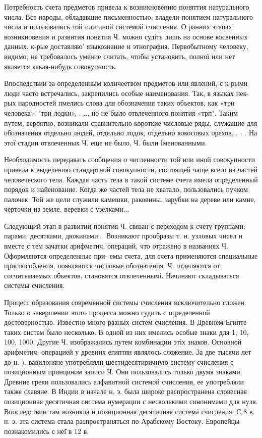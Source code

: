 \documentclass[10pt]{article}
\begin{document}
Потребность счета предметов привела к возникновению поняттия натурального числа. Все народы, обладавшие письменностью, владели понятием натурального числа и пользовались той или иной системой счисления. О ранних этапах возникновения и развития понятия Ч. можно судіть лишь на основе косвенных данных, к-рые доставляю' языкознание и этнография. Первобытному человеку, видимо, не требовалось умение считать, чтобы установить, полної или нет является какая-нибудь совокупность.



Впоследствии за определенным количеетвом предметов или явлений, с к-рыми люди часто встречались, закрепились особые наименования. Так, в языках нек-рых народностей пмелись слова для обозначения таких объектов, как «три человека», "три лодки», . .., но не было отвлеченного понятия «трп". Таким путем, вероятно, возникали сравнительно короткие числовые ряды, служащие для обозначения отдельно людей, отдельно лодок, отдельно кокосовых орехов, . . . На этої стадии отвлеченных Ч. еще не было, Ч. были Іменованными.



Необходимость передавать сообщения о численности той или иной совокупности привела к выделению стандартной совокупности, состоящей чаще всего из частей человеческого тела. Каждая часть тела в такой системе счета имела определенный порядок и найенование. Когда же частей тела не хватало, пользовались пучком палочек. Той же цели служили камешки, раковины, зарубки на дереве или камне, черточки на земле, веревки с узелками...



Следующий этап в развитии понятия Ч. связан с переходом к счету группами: парами, десятками, дюжинами... Возникают прообразы т. н. узловых чисел и вместе с тем зачатки арифметич. операций, что отражено в названиях Ч. Оформляются определенные при- емы счета, для счета применяются специальные приспособления, появляются числовые обознатения. Ч. отделяются от сосчитываемых объектов, становятся отвлеченнымі. Начинают складываться системы счисления.



Процесс образования современной системы счисления исключительно сложен. Только о завершении этого процесса можно судить с огределенной достоверностыо. Известно много разных систем счисления. В Древнем Египте таких систем было несколько. В одной из них имелись особые знаки для 1, 10, 100, 1000. Другие Ч. изображались путем комбинации этіх знаков. Основной арифметич. операцией у древних египтян являлось сложение. За две тысячи лет до н. ). вавилоняне употребляли шестидесятиричную систему счисления с позиционным принцином записи Ч. Они пользовались только двумя знаками. Древние греки пользовались алфавитной системой счисления, ее употребляли также славяне. В Индии в начале н. э. была широко распространена словесная позиционная десятичная система нумерации с несколькими синонимами для нуля. Впоследствии там возникла и позиционная десятичная система счисления. С 8 в. н. э. эта система стала распространяться по Арабскому Востоку. Европейцы познакомились с неї̈ в 12 в.
\end{document}

